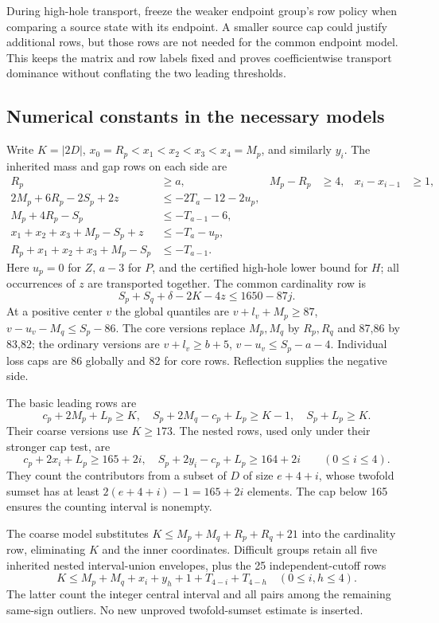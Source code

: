 \documentclass[11pt,a4paper]{article}
\begin{document}
During high-hole transport, freeze the weaker endpoint group's row
policy when comparing a source state with its endpoint. A smaller
source cap could justify additional rows, but those rows are not needed
for the common endpoint model. This keeps the matrix and row labels
fixed and proves coefficientwise transport dominance without conflating
the two leading thresholds.

\subsection{Numerical constants in the necessary models}
Write $K=|2D|$, $x_0=R_p<x_1<x_2<x_3<x_4=M_p$, and similarly $y_i$.
The inherited mass and gap rows on each side are
\begin{align*}
 R_p&\ge a,&M_p-R_p&\ge4,&x_i-x_{i-1}&\ge1,\\
 2M_p+6R_p-2S_p+2z&\le-2T_a-12-2u_p,\\
 M_p+4R_p-S_p&\le-T_{a-1}-6,\\
 x_1+x_2+x_3+M_p-S_p+z&\le-T_a-u_p,\\
 R_p+x_1+x_2+x_3+M_p-S_p&\le-T_{a-1}.
\end{align*}
Here $u_p=0$ for $Z$, $a-3$ for $P$, and the certified high-hole
lower bound for $H$; all occurrences of $z$ are transported together.
The common cardinality row is
\[
 S_p+S_q+\delta-2K-4z\le1650-87j.
\]
At a positive center $v$ the global quantiles are
$v+l_v+M_p\ge87$, $v-u_v-M_q\le S_p-86$.
The core versions replace $M_p,M_q$ by $R_p,R_q$ and 87,86 by 83,82;
the ordinary versions are $v+l_v\ge b+5$, $v-u_v\le S_p-a-4$.
Individual loss caps are 86 globally and 82 for core rows. Reflection
supplies the negative side.

The basic leading rows are
\[
 c_p+2M_p+L_p\ge K,\quad S_p+2M_q-c_p+L_p\ge K-1,
 \quad S_p+L_p\ge K.
\]
Their coarse versions use $K\ge173$. The nested rows, used only under
their stronger cap test, are
\[
 c_p+2x_i+L_p\ge165+2i,\quad
 S_p+2y_i-c_p+L_p\ge164+2i\qquad(0\le i\le4).
\]
They count the contributors from a subset of $D$ of size $e+4+i$,
whose twofold sumset has at least $2(e+4+i)-1=165+2i$ elements.
The cap below 165 ensures the counting interval is nonempty.

The coarse model substitutes
$K\le M_p+M_q+R_p+R_q+21$ into the cardinality row, eliminating $K$
and the inner coordinates. Difficult groups retain all five inherited
nested interval-union envelopes, plus the 25 independent-cutoff rows
\[
 K\le M_p+M_q+x_i+y_h+1+T_{4-i}+T_{4-h}\quad(0\le i,h\le4).
\]
The latter count the integer central interval and all pairs among the
remaining same-sign outliers. No new unproved twofold-sumset estimate
is inserted.
\end{document}
